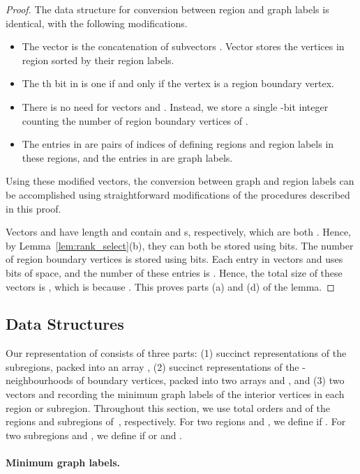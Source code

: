 \begin{proof}
  The data structure for conversion between region and graph labels is
  identical, with the following modifications.
  \begin{itemize}
  \item The vector  is the concatenation of  subvectors
    .
    Vector  stores the vertices in region  sorted
    by their region labels.
  \item The th bit in  is one if and only if the vertex
     is a region boundary vertex.
  \item There is no need for vectors  and .
    Instead, we store a single -bit integer counting the number
    of region boundary vertices of .
  \item The entries in  are pairs of indices of defining
    regions and region labels in these regions, and the entries in
     are graph labels.
  \end{itemize}
  Using these modified vectors, the conversion between graph and region labels
  can be accomplished using straightforward modifications of the procedures
  described in this proof.

  Vectors  and  have length
   and contain  and
   s, respectively, which are both .
  Hence, by Lemma~\ref{lem:rank_select}(b), they can both be stored using
   bits.
  The number of region boundary vertices is stored using 
  bits.
  Each entry in vectors  and  uses  bits
  of space, and the number of these entries is .
  Hence, the total size of these vectors is ,
  which is  because .
  This proves parts (a) and (d) of the lemma.
\end{proof}

\subsection{Data Structures}\label{sec:datastructs}


Our representation of  consists of three parts: (1) succinct
representations of the subregions, packed into an array , (2)
succinct representations of the -neighbourhoods of boundary
vertices, packed into two arrays  and , and (3) two
vectors  and  recording the minimum graph labels of
the interior vertices in each region or subregion.
Throughout this section, we use total orders  and  of the
regions and subregions of~, respectively.
For two regions  and , we define  if
.
For two subregions  and , we define
 if  or  and .

\paragraph{Minimum graph labels.}


